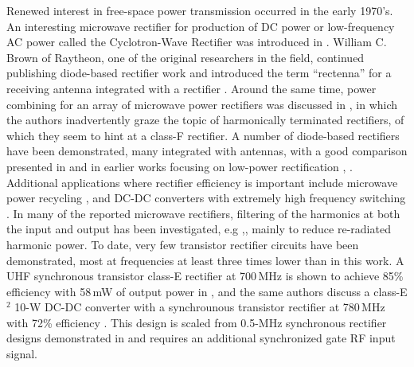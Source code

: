Renewed interest in free-space power transmission occurred in the early 1970's. An interesting microwave rectifier for production of DC power or low-frequency AC power called the Cyclotron-Wave Rectifier was introduced in \cite{cyclotron_rect1,cyclotron_rect2}. William C. Brown of Raytheon, one of the original researchers in the field, continued publishing diode-based rectifier work and introduced the term ``rectenna'' for a receiving antenna integrated with a rectifier \cite{brown1_1970,brown3_1970,brown}.  Around the same time,  power combining for an array of microwave power rectifiers was discussed in \cite{rect_power_combine}, in which the authors inadvertently graze the topic of harmonically terminated rectifiers, of which they seem to hint at a class-F rectifier.
A number of diode-based rectifiers have been demonstrated, many integrated with antennas, with a good comparison presented in \cite{erezMTT2012}  and in earlier works focusing on low-power rectification \cite{hagerty}, \cite{erez_thesis}. Additional applications where rectifier efficiency is important include microwave power recycling \cite{asbeck}, and DC-DC converters with extremely high frequency switching \cite{4500dcdc,JoseIMS-rect}. In many of the reported microwave rectifiers, filtering of the harmonics at both the input and output has been investigated, e.g \cite{rectifier_harmonic_generation},\cite{low_cost_rectenna}, mainly to reduce re-radiated harmonic power. To date, very few transistor rectifier circuits have been demonstrated, most at frequencies at least three times lower than in this work.  A UHF synchronous transistor class-E rectifier at 700\,MHz is shown to achieve 85\% efficiency with 58\,mW of output power in \cite{JoseIMS-rect}, and the same authors discuss a class-E$^2$ 10-W DC-DC converter with a synchrounous transistor rectifier at 780\,MHz with 72\% efficiency \cite{Jose-DC-DC-IMS}. This design is scaled from 0.5-MHz synchronous rectifier designs demonstrated in \cite{Kaz} and requires an additional synchronized gate RF input signal.
